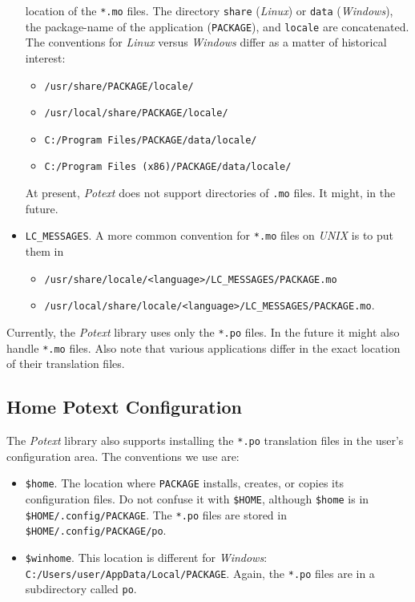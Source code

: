 \documentclass[
 11pt,
 twoside,
 a4paper,
 final                                 %
]{article}
\begin{document}
\begin{itemize}
         location of the \texttt{*.mo} files.
         The directory \texttt{share} (\textsl{Linux})
         or \texttt{data} (\textsl{Windows}),
         the package-name of the application
         (\texttt{PACKAGE}), and \texttt{locale} are concatenated.
         The conventions for \textsl{Linux} versus \textsl{Windows}
         differ as a matter of historical interest:
         \begin{itemize}
            \item \texttt{/usr/share/PACKAGE/locale/}
            \item \texttt{/usr/local/share/PACKAGE/locale/}
            \item \texttt{C:/Program Files/PACKAGE/data/locale/}
            \item \texttt{C:/Program Files (x86)/PACKAGE/data/locale/}
         \end{itemize}
            At present, \textsl{Potext} does not support directories of
            \texttt{.mo} files. It might, in the future.
      \item \texttt{LC\_MESSAGES}. A more common convention for
            \texttt{*.mo} files on \textsl{UNIX} is to put them in
         \begin{itemize}
            \item \texttt{/usr/share/locale/<language>/LC\_MESSAGES/PACKAGE.mo}
            \item \texttt{/usr/local/share/locale/<language>/LC\_MESSAGES/PACKAGE.mo}.
         \end{itemize}
   \end{itemize}

   Currently, the \textsl{Potext} library uses only the \texttt{*.po} files.
   In the future it might also handle \texttt{*.mo} files.
   Also note that various applications differ in the exact location of their
   translation files.

\subsection{Home Potext Configuration}
\label{subsec:introduction_home_potext_configuration}

   The \textsl{Potext} library also supports installing the
   \texttt{*.po} translation files in the user's configuration area.
   The conventions we use are:

   \begin{itemize}
      \item \texttt{\$home}. The location where \texttt{PACKAGE} installs,
         creates, or copies its configuration files.
         Do not confuse it with \texttt{\$HOME},
         although \texttt{\$home} is in
         \texttt{\$HOME/.config/PACKAGE}.
         The \texttt{*.po} files are stored in
         \texttt{\$HOME/.config/PACKAGE/po}.
      \item \texttt{\$winhome}. This location is different for
         \textsl{Windows}:
         \texttt{C:/Users/user/AppData/Local/PACKAGE}.
         Again, the \texttt{*.po} files are in a
         subdirectory called \texttt{po}.
   \end{itemize}
\end{document}
